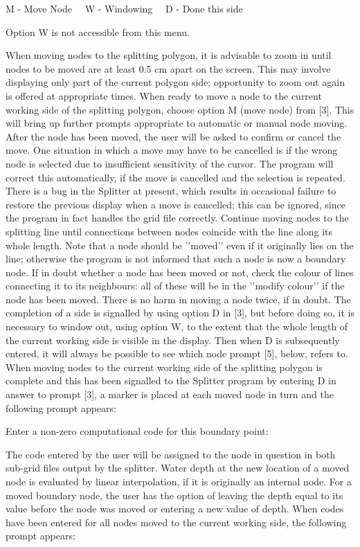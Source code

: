 \documentclass{article}
\begin{document}
M - Move Node \ \ W - Windowing \ \ D - Done this side

Option W is not accessible from this menu.

When moving nodes to the splitting polygon, it is advisable to zoom in until nodes to be moved are at least 0.5 cm apart on the screen. This may involve displaying only part of the current polygon side; opportunity to zoom out again is offered at appropriate times. When ready to move a node to the current working side of the splitting polygon, choose option M (move node) from [3]. This will bring up further prompts appropriate to automatic or manual node moving. After the node has been moved, the user will be asked to confirm or cancel the move. One situation in which a move may have to be cancelled is if the wrong node is selected due to insufficient sensitivity of the cursor. The program will correct this automatically, if the move is cancelled and the selection is repeated. There is a bug in the Splitter at present, which results in occasional failure to restore the previous display when a move is cancelled; this can be ignored, since the program in fact handles the grid file correctly. Continue moving 
nodes to the splitting line until connections between nodes coincide with the line along its whole length. Note that a node should be '{}'moved'{}' even if it originally lies on the line; otherwise the program is not informed that such a node is now a boundary node. If in doubt whether a node has been moved or not, check the colour of lines connecting it to its neighbours: all of these will be in the '{}'modify colour'{}' if the node has been moved. There is no harm in moving a node twice, if in doubt. The completion of a side is signalled by using option D in [3], but before doing so, it is necessary to window out, using option W, to the extent that the whole length of the current working side is visible in the display. Then when D is subsequently entered, it will always be possible to see which node prompt [5], below, refers to. When moving nodes to the current working side of the splitting polygon is complete and this has been signalled to the Splitter program by entering D in answer to prompt [3], a 
marker is placed at each moved node in turn and the following prompt appears:

Enter a non-zero computational code for this boundary point:

The code entered by the user will be assigned to the node in question in both sub-grid files output by the splitter. Water depth at the new location of a moved node is evaluated by linear interpolation, if it is originally an internal node. For a moved boundary node, the user has the option of leaving the depth equal to its value before the node was moved or entering a new value of depth. When codes have been entered for all nodes moved to the current working side, the following prompt appears:
\end{document}

